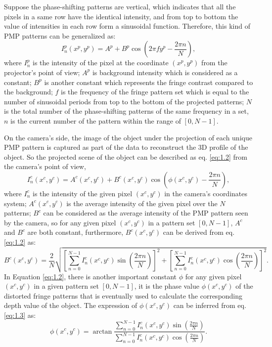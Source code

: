 \documentclass[]{spie}  %
\begin{document}
Suppose the phase-shifting patterns are vertical, which indicates that all the pixels in a same row have the identical intensity, and from top to bottom the value of intensities in each row form a sinusoidal function. Therefore, this kind of PMP patterns can be generalized as:
 \begin{equation} \label{eq:1.1}
  	I^p_n(x^p, y^p) = A^p + B^p\cos(2\pi f y^p - \frac{2\pi n}{N}),
  \end{equation}
where $I^p_n$ is the intensity of the pixel at the coordinate $(x^p, y^p)$ from the projector's point of view; $A^p$ is background intensity which is considered as a constant; $B^p$ is another constant which represents the fringe contrast compared to the background; $f$ is the frequency of the fringe pattern set which is equal to the number of sinusoidal periods from top to the bottom of the projected patterns; $N$ is the total number of the phase-shifting patterns of the same frequency in a set, $n$ is the current number of the pattern within the range of $[0, N-1]$.

On the camera's side, the image of  the object under the projection of each unique PMP pattern is captured as part of the data to reconstruct the 3D profile of the object. So the projected scene of the object can be described as eq. \eqref{eq:1.2} from the camera's point of view, 
 \begin{equation} \label{eq:1.2}
  	I^c_n(x^c, y^c) =  A^c(x^c, y^c) + B^c(x^c, y^c)\cos(\phi(x^c, y^c) - \frac{2\pi n}{N}),
  \end{equation}
where $I^c_n$ is the intensity of the given pixel $(x^c, y^c)$ in the camera's coordinates system; $A^c(x^c, y^c)$ is the average intensity of the given pixel over the $N$ patterns; $B^c$ can be considered as the average intensity of the PMP pattern seen by the camera, so for any given pixel $(x^c, y^c)$ in a pattern set $[0, N-1]$, $A^c$ and $B^c$ are both constant, furthermore, $B^c(x^c, y^c)$ can be derived from eq. \eqref{eq:1.2} as:
  \begin{equation} \label{eq:1.3}
  	B^c(x^c, y^c) = \frac{2}{N}\sqrt{\left[\sum_{n=0}^{N-1}I_n^c(x^c, y^c)\sin (\frac{2\pi n}{N})\right]^2 + \left[\sum_{n=0}^{N-1}I_n^c(x^c, y^c)\cos (\frac{2\pi n}{N})\right]^2}.
  \end{equation}
In Equation \ref{eq:1.2}, there is another important constant $\phi$ for any given pixel $(x^c, y^c)$ in a given pattern set $[0, N-1]$, it is the phase value $\phi (x^c, y^c)$ of the distorted fringe patterns that is eventually used to calculate the corresponding depth value of the object. The expression of $\phi (x^c, y^c)$ can be inferred from eq. \eqref{eq:1.3} as:
  \begin{equation} \label{eq:1.4}
  	\phi (x^c, y^c) = \arctan \frac{\sum_{n=0}^{N-1} I^c_n(x^c, y^c)\sin(\frac{2\pi n}{N})}{\sum_{n=0}^{N-1} I^c_n(x^c, y^c)\cos(\frac{2\pi n}{N})}.
  \end{equation}
\end{document}
